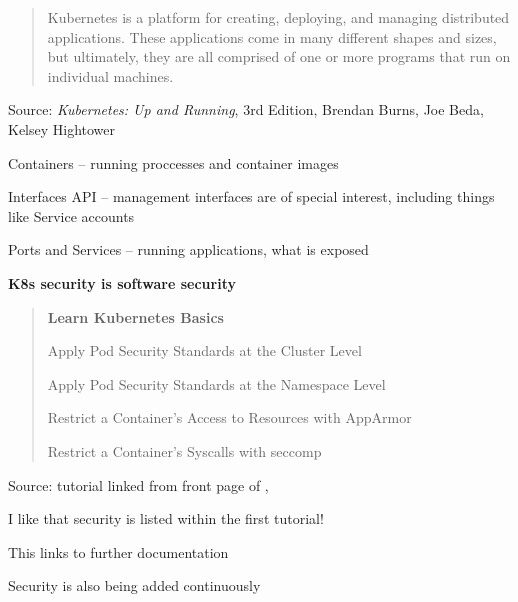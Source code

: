 \documentclass[Screen16to9,17pt]{foils}
\begin{document}


\begin{quote}
Kubernetes is a platform for creating, deploying, and managing distributed applications. These applications come in many different shapes and sizes, but ultimately, they are all comprised of one or more programs that run on individual machines.
\end{quote}
Source: \emph{Kubernetes: Up and Running}, 3rd Edition, Brendan Burns, Joe Beda, Kelsey Hightower

\begin{list2}
\item Containers -- running proccesses and container images
\item Interfaces API -- management interfaces are of special interest, including things like Service accounts
\item Ports and Services -- running applications, what is exposed
\item {\bf K8s security is software security}
\end{list2}






\begin{quote}
{\bf Learn Kubernetes Basics}
\begin{list2}
\item Apply Pod Security Standards at the Cluster Level
\item Apply Pod Security Standards at the Namespace Level
\item Restrict a Container's Access to Resources with AppArmor
\item Restrict a Container's Syscalls with seccomp
\end{list2}
\end{quote}
Source: tutorial  linked from front page of ,\\

\begin{list2}
\item I like that security is listed within the first tutorial!
\item This links to further documentation
\item Security is also being added continuously
\end{list2}
\end{document}
